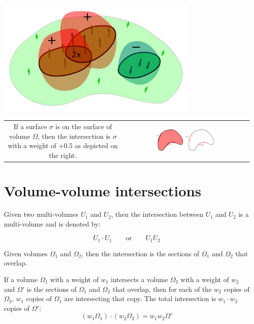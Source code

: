 \begin{center}
\includegraphics[width = 0.75\textwidth]{Intersections/Surface-volume_intersections/surface_volume_intersections_example_3}
\end{center}

\begin{tabular}{cc}
\parbox{0.5\textwidth}{
If a surface \(\sigma\) is on the surface of volume \(\Omega\), then the intersection is \(\sigma\) with a weight of \(+0.5\) as depicted on the right.
} & \parbox{0.5\textwidth}{
\includegraphics[width = 0.5\textwidth]{Intersections/Surface-volume_intersections/surface_volume_intersection_boundary_case}
}
\end{tabular}





\section{Volume-volume intersections}

Given two multi-volumes \(U_1\) and \(U_2\), then the intersection between \(U_1\) and \(U_2\) is a multi-volume and is denoted by:

\[U_1 \cdot U_1 \quad\quad\text{or}\quad\quad U_1 U_2\]

Given volumes \(\Omega_1\) and \(\Omega_2\), then the intersection is the sections of \(\Omega_1\) and \(\Omega_2\) that overlap. 

If a volume \(\Omega_1\) with a weight of \(w_1\) intersects a volume \(\Omega_2\) with a weight of \(w_2\) and \(\Omega'\) is the sections of \(\Omega_1\) and \(\Omega_2\) that overlap, then for each of the \(w_2\) copies of \(\Omega_2\), \(w_1\) copies of \(\Omega_1\) are intersecting that copy. The total intersection is \(w_1 \cdot w_2\) copies of \(\Omega'\):
\[(w_1\Omega_1) \cdot (w_2\Omega_2) = w_1 w_2 \Omega'\] 

